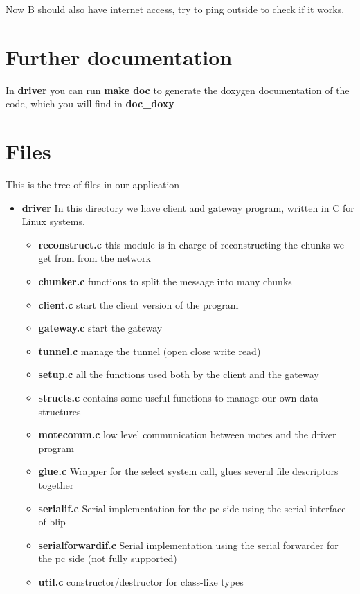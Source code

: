 \documentclass[11pt]{article}
\begin{document}
  
  Now B should also have internet access, try to ping outside to check if it works.
\section*{Further documentation}
\label{sec-3}

  In \textbf{driver} you can run \textbf{make doc} to generate the doxygen documentation of the code, which you will find in \textbf{doc\_doxy}
\section*{Files}
\label{sec-4}

  This is the tree of files in our application
\begin{itemize}
\item \textbf{driver}
    In this directory we have client and gateway program, written in C for Linux systems.

\begin{itemize}
\item \textbf{reconstruct.c}
      this module is in charge of reconstructing the chunks we get from from the network
\item \textbf{chunker.c}
      functions to split the message into many chunks
\item \textbf{client.c}
      start the client version of the program
\item \textbf{gateway.c}
      start the gateway
\item \textbf{tunnel.c}
      manage the tunnel (open close write read)
\item \textbf{setup.c}
      all the functions used both by the client and the gateway
\item \textbf{structs.c}
      contains some useful functions to manage our own data structures
\item \textbf{motecomm.c}
      low level communication between motes and the driver program
\item \textbf{glue.c}
      Wrapper for the select system call, glues several file descriptors together
\item \textbf{serialif.c}
      Serial implementation for the pc side using the serial interface of blip
\item \textbf{serialforwardif.c}
      Serial implementation using the serial forwarder for the pc side (not fully supported)
\item \textbf{util.c}
      constructor/destructor for class-like types
\end{itemize}


\end{itemize}
\end{document}
